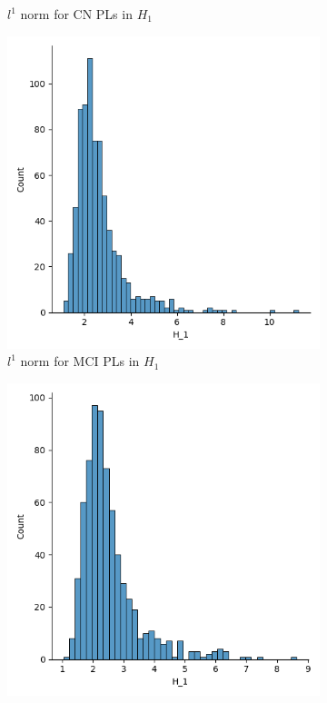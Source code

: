 \documentclass{article}
\begin{document}
\begin{figure}
\begin{subfigure}{0.3\textwidth}
    \caption{$l^1$ norm for CN PLs in $H_1$}
  \end{subfigure}
  \begin{subfigure}{0.3\textwidth}
    \includegraphics[width=\textwidth]{figures/average_pls/average_pl_MCI_H_1.png}
    \caption{$l^1$ norm for MCI PLs in $H_1$}
  \end{subfigure}
  \begin{subfigure}{0.3\textwidth}
    \includegraphics[width=\textwidth]{figures/average_pls/average_pl_AD_H_1.png}

\end{subfigure}
\end{figure}
\end{document}
